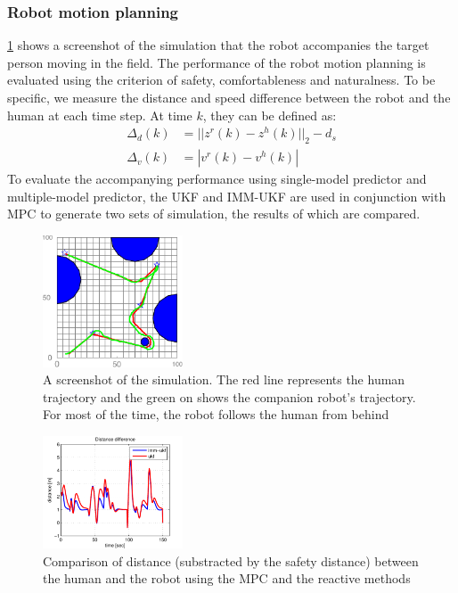 \documentclass[letterpaper, 10 pt, conference]{ieeeconf}
\begin{document}
\subsubsection{Robot motion planning}\label{subsubsec:motion_plan}
\cref{fig:robot_accom} shows a screenshot of the simulation that the robot accompanies the target person moving in the field.
The performance of the robot motion planning is evaluated using the criterion of safety, comfortableness and naturalness.
To be specific, we measure the distance and speed difference between the robot and the human at each time step.
At time $k$, they can be defined as:
\begin{subequations}
\begin{align}
\Delta_d(k)&=||z^r(k)-z^h(k)||_2-d_s\label{eqn:err_d}\\
\Delta_v(k)&=|v^r(k)-v^h(k)|\label{eqn:err_v}
\end{align}
\end{subequations}
To evaluate the accompanying performance using single-model predictor and multiple-model predictor, the UKF and IMM-UKF are used in conjunction with MPC to generate two sets of simulation, the results of which are compared.
\begin{figure}
\centering
\includegraphics[width=0.37\textwidth]{figures/sim_traj.pdf}
\caption{A screenshot of the simulation. The red line represents the human trajectory and the green on shows the companion robot's trajectory. For most of the time, the robot follows the human from behind}
\label{fig:robot_accom}
\end{figure}
\begin{figure}
\centering
\includegraphics[width=0.37\textwidth]{figures/dis_diff.pdf}
\caption{Comparison of distance (substracted by the safety distance) between the human and the robot using the MPC and the reactive methods}
\label{fig:err_d}
\end{figure}
\end{document}
